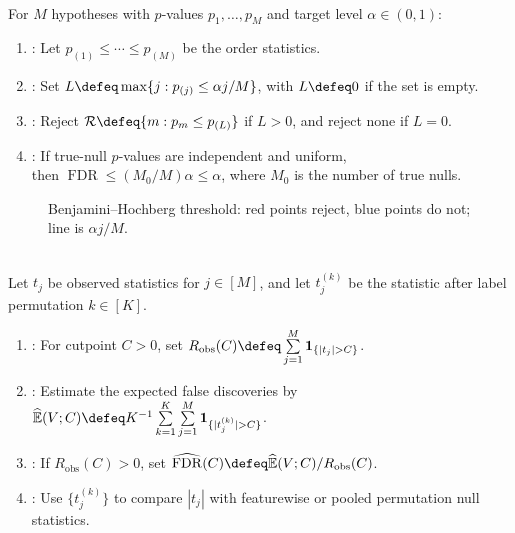 \begin{method} \label{meth:benjamini-hochberg-fdr-step-up} \\
For $M$ hypotheses with $p$-values $p_1,\ldots,p_M$ and target level $\alpha\in(0,1)$:
\begin{enumerate}[label=(\roman*)]
\setlength{\itemsep}{0pt}
\item {}: Let $p_{(1)}\leq\cdots\leq p_{(M)}$ be the order statistics.
\item {}: Set $L\defeq\max\{j:p_{(j)}\leq\alpha j/M\}$, with $L\defeq0$ if the set is empty.
\item {}: Reject $\mathcal{R}\defeq\{m:p_m\leq p_{(L)}\}$ if $L>0$, and reject none if $L=0$.
\item {}: If true-null $p$-values are independent and uniform,\\
then $\operatorname{FDR}\leq(M_0/M)\alpha\leq\alpha$, where $M_0$ is the number of true nulls.
\end{enumerate}
\end{method}

\begin{figure}[H]
\centering

\caption{Benjamini--Hochberg threshold: \textcolor{red!70!black}{red} points reject, \textcolor{blue!70!black}{blue} points do not; line is $\alpha j/M$.}
\label{fig:benjamini-hochberg-step-up}
\end{figure}

\begin{method} \label{meth:permutation-plug-in-fdr} \\
Let $t_j$ be observed statistics for $j\in[M]$, and let $t_j^{(k)}$ be the statistic after label permutation $k\in[K]$.
\begin{enumerate}[label=(\roman*)]
\setlength{\itemsep}{0pt}
\item {}: For cutpoint $C>0$, set $R_{\mathrm{obs}}(C)\defeq\sum\limits_{j=1}^M\mathbf{1}_{\{|t_j|>C\}}$.
\item {}: Estimate the expected false discoveries by $\widehat{\mathbb{E}}(V;C)\defeq K^{-1}\sum\limits_{k=1}^K\sum\limits_{j=1}^M\mathbf{1}_{\{|t_j^{(k)}|>C\}}$.
\item {}: If $R_{\mathrm{obs}}(C)>0$, set $\widehat{\operatorname{FDR}}(C)\defeq\widehat{\mathbb{E}}(V;C)/R_{\mathrm{obs}}(C)$.
\item {}: Use $\{t_j^{(k)}\}$ to compare $|t_j|$ with featurewise or pooled permutation null statistics.
\end{enumerate}
\end{method}

